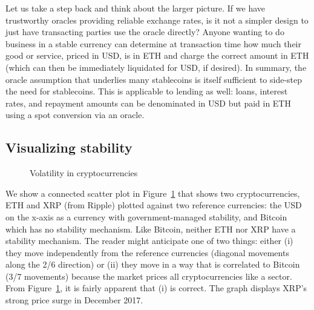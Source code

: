 Let us take a step back and think about the larger picture. If we have trustworthy oracles providing reliable exchange rates, is it not a simpler design to just have transacting parties use the oracle directly? Anyone wanting to do business in a stable currency can determine at transaction time how much their good or service, priced in USD, is in ETH and charge the correct amount in ETH (which can then be immediately liquidated for USD, if desired). In summary, the oracle assumption that underlies many stablecoins is itself sufficient to side-step the need for stablecoins. This is applicable to lending as well: loans, interest rates, and repayment amounts can be denominated in USD but paid in ETH using a spot conversion via an oracle.


\subsection{Visualizing stability}\label{sec:stability}

\begin{figure}[t]
	\centering
	\hfill
	\caption{Volatility in cryptocurrencies}
	\label{fig:fiatandcrypto}
\end{figure}

We show a connected scatter plot in Figure~\ref{fig:fiatandcrypto} that shows two cryptocurrencies, ETH and XRP (from Ripple) plotted against two reference currencies: the USD on the x-axis as a currency with government-managed stability, and Bitcoin which has no stability mechanism. Like Bitcoin, neither ETH nor XRP have a stability mechanism. The reader might anticipate one of two things: either (i) they move independently from the reference currencies (diagonal movements along the 2/6 direction) or (ii) they move in a way that is correlated to Bitcoin (3/7 movements) because the market prices all cryptocurrencies like a sector. From Figure~\ref{fig:fiatandcrypto}, it is fairly apparent that (i) is correct. The graph displays XRP's strong price surge in December 2017.


